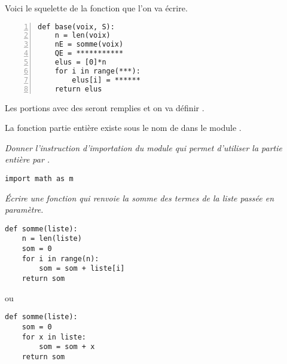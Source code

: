 \newpage

Voici le squelette de la fonction que l'on va écrire.
\begin{lstlisting}[numbers = left]
def base(voix, S):
    n = len(voix)
    nE = somme(voix)
    QE = ***********
    elus = [0]*n
    for i in range(***):
        elus[i] = ******
    return elus
\end{lstlisting}
Les portions avec des \type{*} seront remplies et on va définir .

\medskip

La fonction partie entière existe sous le nom de  dans le module .
\begin{Exercise}\it
Donner l'instruction d'importation du module  qui permet d'utiliser la partie entière par .
\end{Exercise}
\begin{Answer}
\begin{lstlisting}
import math as m
\end{lstlisting}
\newpage
\end{Answer}
\begin{Exercise}[title = Ligne 3]\it
Écrire une fonction  qui renvoie la somme des termes de la liste passée en paramètre.
\end{Exercise}
\begin{Answer}
\begin{lstlisting}
def somme(liste):
    n = len(liste)
    som = 0
    for i in range(n):
        som = som + liste[i]
    return som
\end{lstlisting}

ou 

\begin{lstlisting}
def somme(liste):
    som = 0
    for x in liste:
        som = som + x
    return som
\end{lstlisting}
\end{Answer}
